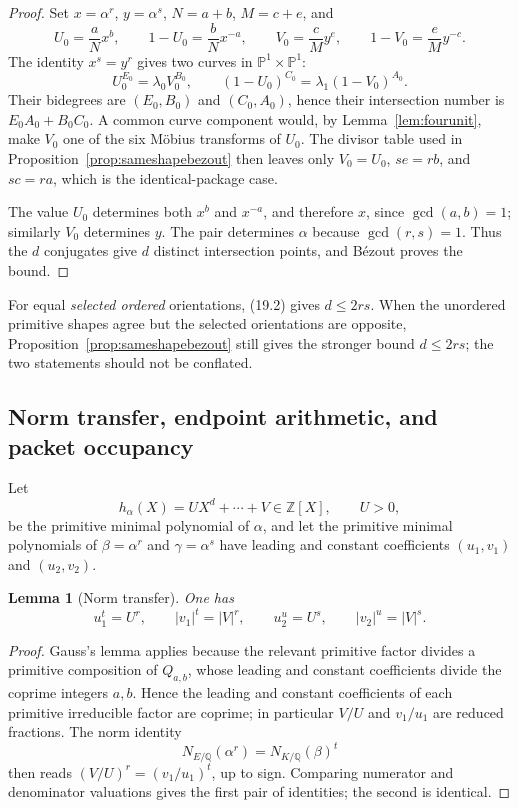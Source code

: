\documentclass[11pt]{article}
\newtheorem{lemma}[theorem]{Lemma}
\theoremstyle{definition}
\newcommand{\Q}{\mathbb Q}
\newcommand{\Z}{\mathbb Z}
\begin{document}
\begin{proof}
Set \(x=\alpha^r\), \(y=\alpha^s\), \(N=a+b\), \(M=c+e\), and
\[
 U_0=\frac aN x^b,\qquad 1-U_0=\frac bN x^{-a},
 \qquad
 V_0=\frac cM y^e,\qquad 1-V_0=\frac eM y^{-c}.
\]
The identity \(x^s=y^r\) gives two curves in
\(\mathbb P^1\times\mathbb P^1\):
\[
 U_0^{E_0}=\lambda_0V_0^{B_0},\qquad
 (1-U_0)^{C_0}=\lambda_1(1-V_0)^{A_0}.
\]
Their bidegrees are \((E_0,B_0)\) and \((C_0,A_0)\), hence their
intersection number is \(E_0A_0+B_0C_0\).  A common curve component would,
by Lemma~\ref{lem:fourunit}, make \(V_0\) one of the six M\"obius transforms
of \(U_0\).  The divisor table used in Proposition~\ref{prop:sameshapebezout}
then leaves only \(V_0=U_0\), \(se=rb\), and \(sc=ra\), which is the
identical-package case.

The value \(U_0\) determines both \(x^b\) and \(x^{-a}\), and therefore
\(x\), since \(\gcd(a,b)=1\); similarly \(V_0\) determines \(y\).  The
pair determines \(\alpha\) because \(\gcd(r,s)=1\).  Thus the \(d\)
conjugates give \(d\) distinct intersection points, and B\'ezout proves the
bound.
\end{proof}

For equal \emph{selected ordered} orientations, (19.2) gives \(d\leq2rs\).
When the unordered primitive shapes agree but the selected orientations are
opposite, Proposition~\ref{prop:sameshapebezout} still gives the stronger
bound \(d\leq2rs\); the two statements should not be conflated.

\subsection{Norm transfer, endpoint arithmetic, and packet occupancy}

Let
\[
 h_\alpha(X)=UX^d+\cdots+V\in\Z[X],\qquad U>0,
\]
be the primitive minimal polynomial of \(\alpha\), and let the primitive
minimal polynomials of \(\beta=\alpha^r\) and \(\gamma=\alpha^s\) have
leading and constant coefficients \((u_1,v_1)\) and \((u_2,v_2)\).

\begin{lemma}[Norm transfer]\label{lem:normtransfer}
One has
\begin{equation}
 u_1^t=U^r,\qquad |v_1|^t=|V|^r,
 \qquad
 u_2^u=U^s,\qquad |v_2|^u=|V|^s.
 \tag{19.3}
\end{equation}
\end{lemma}

\begin{proof}
Gauss's lemma applies because the relevant primitive factor divides a
primitive composition of \(Q_{a,b}\), whose leading and constant
coefficients divide the coprime integers \(a,b\).  Hence the leading and
constant coefficients of each primitive irreducible factor are coprime; in
particular \(V/U\) and \(v_1/u_1\) are reduced fractions.  The norm identity
\[
 N_{E/\Q}(\alpha^r)=N_{K/\Q}(\beta)^t
\]
then reads \((V/U)^r=(v_1/u_1)^t\), up to sign.  Comparing numerator and
denominator valuations gives the first pair of identities; the second is
identical.
\end{proof}
\end{document}
